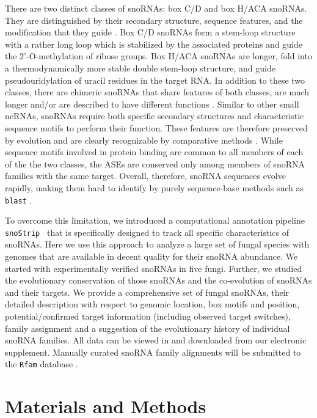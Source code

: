 \documentclass[preprint,3p,times,twocolumn]{elsarticle}
\newcommand{\snostrip}{\texttt{snoStrip}}
\begin{document}
There are two distinct classes of snoRNAs: box C/D and box H/ACA
snoRNAs.  They are distinguished by their secondary structure,
sequence features, and the modification that they guide
\cite{Balakin:1996,Tollervey:1997}.  Box C/D snoRNAs form a stem-loop
structure with a rather long loop which is stabilized by the
associated proteins and guide the 2'-O-methylation of ribose groups.
Box H/ACA snoRNAs are longer, fold into a thermodynamically more
stable double stem-loop structure, and guide pseudouridylation of
uracil residues in the target RNA.  In addition to these two classes,
there are chimeric snoRNAs that share features of both classes, are
much longer and/or are described to have different functions
\cite{Darzacq:2002}. Similar to other small ncRNAs, snoRNAs require
both specific secondary structures and characteristic sequence motifs
to perform their function. These features are therefore preserved by
evolution and are clearly recognizable by comparative methods
\cite{Ganot:1997,Tollervey:1997}. While sequence motifs involved in
protein binding are common to all members of each of the the two
classes, the ASEs are conserved only among members of snoRNA families
with the same target. Overall, therefore, snoRNA sequences evolve
rapidly, making them hard to identify by purely sequence-base methods
such as \texttt{blast} \cite{Altschul:1990}.

To overcome this limitation, we introduced a computational annotation
pipeline \snostrip\ \cite{Bartschat:2014} that is specifically designed to
track all specific characteristics of snoRNAs. Here we use this approach to
analyze a large set of fungal species with genomes that are available in
decent quality for their snoRNA abundance.  We started with experimentally
verified snoRNAs in five fungi.  Further, we studied the evolutionary
conservation of those snoRNAs and the co-evolution of snoRNAs and their
targets. We provide a comprehensive set of fungal snoRNAs, their detailed
description with respect to genomic location, box motifs and position,
potential/confirmed target information (including observed target
switches), family assignment and a suggestion of the evolutionary history
of individual snoRNA families.  All data can be viewed in and downloaded
from our electronic supplement. Manually curated snoRNA family alignments
will be submitted to the \texttt{Rfam} database \cite{Nawrocki:2015}.


\section{Materials and Methods}
\end{document}
